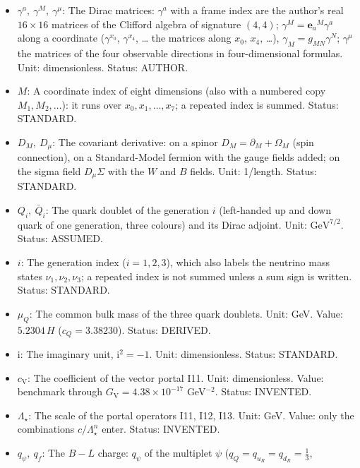 \documentclass[
  10pt,
]{article}
\providecommand{\tightlist}{%
  \setlength{\itemsep}{0pt}\setlength{\parskip}{0pt}}
\begin{document}
\begin{itemize}
\tightlist
\item
  \(\gamma^a,\ \gamma^M,\ \gamma^\mu\): The Dirac matrices: \(\gamma^a\)
  with a frame index are the author's real \(16 \times 16\) matrices of
  the Clifford algebra of signature \((4, 4)\);
  \(\gamma^M = \mathbf{e}_a{}^M\gamma^a\) along a coordinate
  (\(\gamma^{x_0}\), \(\gamma^{x_4}\), \ldots{} the matrices along
  \(x_0\), \(x_4\), \ldots), \(\gamma_M = g_{MN}\gamma^N\);
  \(\gamma^\mu\) the matrices of the four observable directions in
  four-dimensional formulas. Unit: dimensionless. Status: AUTHOR.
\item
  \(M\): A coordinate index of eight dimensions (also with a numbered
  copy \(M_1, M_2, \dots\)): it runs over \(x_0, x_1, \dots, x_7\); a
  repeated index is summed. Status: STANDARD.
\item
  \(D_M,\ D_\mu\): The covariant derivative: on a spinor
  \(D_M = \partial_M + \Omega_M\) (spin connection), on a Standard-Model
  fermion with the gauge fields added; on the sigma field
  \(D_\mu\Sigma\) with the \(W\) and \(B\) fields. Unit: 1/length.
  Status: STANDARD.
\item
  \(Q_i,\ \bar Q_i\): The quark doublet of the generation \(i\)
  (left-handed up and down quark of one generation, three colours) and
  its Dirac adjoint. Unit: \(\mathrm{GeV}^{7/2}\). Status: ASSUMED.
\item
  \(i\): The generation index (\(i = 1, 2, 3\)), which also labels the
  neutrino mass states \(\nu_1, \nu_2, \nu_3\); a repeated index is not
  summed unless a sum sign is written. Status: STANDARD.
\item
  \(\mu_Q\): The common bulk mass of the three quark doublets. Unit:
  GeV. Value: \(5.2304\,H\) (\(c_Q = 3.38230\)). Status: DERIVED.
\item
  \(\mathrm{i}\): The imaginary unit, \(\mathrm{i}^2 = -1\). Unit:
  dimensionless. Status: STANDARD.
\item
  \(c_{\mathrm{V}}\): The coefficient of the vector portal I11. Unit:
  dimensionless. Value: benchmark through
  \(G_{\mathrm{V}} = 4.38\times10^{-17}\) GeV\(^{-2}\). Status:
  INVENTED.
\item
  \(\Lambda_\star\): The scale of the portal operators I11, I12, I13.
  Unit: GeV. Value: only the combinations \(c/\Lambda_\star^n\) enter.
  Status: INVENTED.
\item
  \(q_\psi,\ q_f\): The \(B - L\) charge: \(q_\psi\) of the multiplet
  \(\psi\) (\(q_Q = q_{u_R} = q_{d_R} = \frac13\),

\end{itemize}
\end{document}
